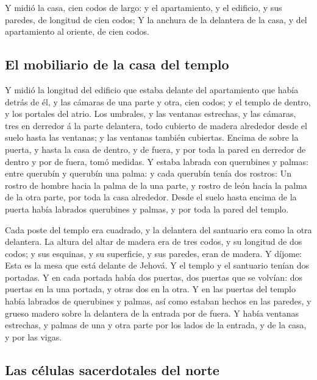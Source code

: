  Y midió la casa, cien codos de largo: y el apartamiento,
y el edificio, y sus paredes, de longitud de cien codos; 
Y la anchura de la delantera de la casa, y del apartamiento al oriente,
de cien codos.

\hypertarget{el-mobiliario-de-la-casa-del-templo}{%
\subsection{El mobiliario de la casa del
templo}\label{el-mobiliario-de-la-casa-del-templo}}

 Y midió la longitud del edificio que estaba delante del
apartamiento que había detrás de él, y las cámaras de una parte y otra,
cien codos; y el templo de dentro, y los portales del atrio.
 Los umbrales, y las ventanas estrechas, y las cámaras,
tres en derredor á la parte delantera, todo cubierto de madera alrededor
desde el suelo hasta las ventanas; y las ventanas también cubiertas.
 Encima de sobre la puerta, y hasta la casa de dentro, y
de fuera, y por toda la pared en derredor de dentro y por de fuera, tomó
medidas.  Y estaba labrada con querubines y palmas: entre
querubín y querubín una palma: y cada querubín tenía dos rostros:
 Un rostro de hombre hacia la palma de la una parte, y
rostro de león hacia la palma de la otra parte, por toda la casa
alrededor.  Desde el suelo hasta encima de la puerta
había labrados querubines y palmas, y por toda la pared del templo.

 Cada poste del templo era cuadrado, y la delantera del
santuario era como la otra delantera.  La altura del
altar de madera era de tres codos, y su longitud de dos codos; y sus
esquinas, y su superficie, y sus paredes, eran de madera. Y díjome: Esta
es la mesa que está delante de Jehová.  Y el templo y el
santuario tenían dos portadas.  Y en cada portada había
dos puertas, dos puertas que se volvían: dos puertas en la una portada,
y otras dos en la otra.  Y en las puertas del templo
había labrados de querubines y palmas, así como estaban hechos en las
paredes, y grueso madero sobre la delantera de la entrada por de fuera.
 Y había ventanas estrechas, y palmas de una y otra parte
por los lados de la entrada, y de la casa, y por las vigas.

\hypertarget{las-cuxe9lulas-sacerdotales-del-norte}{%
\subsection{Las células sacerdotales del
norte}\label{las-cuxe9lulas-sacerdotales-del-norte}}

